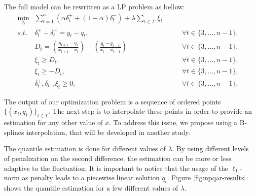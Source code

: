 The full model can be rewritten as a LP problem as bellow:
\begin{eqnarray}
\min_{q_{t}} & \sum_{t=1}^{n}\left(\alpha\delta_{t}^{+}+(1-\alpha)\delta_{t}^{-}\right)+\lambda\sum_{t \in T'}\xi_{t}\\
s.t. & \delta_{t}^{+}-\delta_{t}^{-}=y_{t}-q_{t}, & \qquad\forall t\in\{3,\dots,n-1\},\\
 & D_{t}=\left(\frac{q_{t+1}-q_{t}}{x_{t+1}-x_{t}}\right)-\left(\frac{q_{t}-q_{t-1}}{x_{t}-x_{t-1}}\right) & \qquad\forall t\in\{3,\dots,n-1\},\\
 & \xi_{t}\geq D_{t}, & \qquad\forall t\in\{3,\dots,n-1\},\\
 & \xi_{t}\geq-D_{t}, & \qquad\forall t\in\{3,\dots,n-1\},\\
 & \delta_{t}^{+},\delta_{t}^{-},\xi_{t}\geq0, & \qquad\forall t\in\{3,\dots,n-1\}.
\end{eqnarray}

The output of our optimization problem is a sequence of ordered points $\{(x_t, q_t)\}_{t \in T}$. The next step is to interpolate these points in order to provide an estimation for any other value of $x$. To address this issue, we propose using a B-splines interpolation, that will be developed in another study.

The quantile estimation is done for different values of $\lambda$. By using different levels of penalization on the second difference, the estimation can be more or less adaptive to the fluctuation. It is important to notice that the usage of the $\ell_1$-norm as penalty leads to a piecewise linear solution $q_t$. %
Figure \ref{fig:npqar-results} shows the quantile estimation for a few different values of $\lambda$. 

